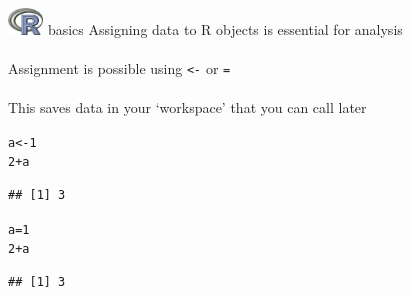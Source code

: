 \documentclass[xcolor=svgnames]{beamer}\usepackage[]{graphicx}\usepackage[]{color}
\makeatletter
\newcommand{\hlnum}[1]{\textcolor[rgb]{0.686,0.059,0.569}{#1}}%
\newcommand{\hlopt}[1]{\textcolor[rgb]{0,0,0}{#1}}%
\newcommand{\hlstd}[1]{\textcolor[rgb]{0.345,0.345,0.345}{#1}}%
\newcommand{\hlkwb}[1]{\textcolor[rgb]{0.69,0.353,0.396}{#1}}%
\newenvironment{kframe}{%
 \def\at@end@of@kframe{}%
 \ifinner\ifhmode%
  \def\at@end@of@kframe{\end{minipage}}%
  \begin{minipage}{\columnwidth}%
 \fi\fi%
 \def\FrameCommand##1{\hskip\@totalleftmargin \hskip-\fboxsep
 \colorbox{shadecolor}{##1}\hskip-\fboxsep
     \hskip-\linewidth \hskip-\@totalleftmargin \hskip\columnwidth}%
 \MakeFramed {\advance\hsize-\width
   \@totalleftmargin\z@ \linewidth\hsize
   \@setminipage}}%
 {\par\unskip\endMakeFramed%
 \at@end@of@kframe}
\newenvironment{knitrout}{}{} %
\makeatother
\begin{document}
\begin{frame}[t,fragile]{\includegraphics[width=0.07\textwidth]{Rlogo.jpg} \hspace{0.01in} basics}
Assigning data to R objects is essential for analysis\\~\\
Assignment is possible using \textit{\texttt{<-}} or \textit{\texttt{=}}\\~\\
This saves data in your `workspace' that you can call later
\begin{knitrout}\scriptsize
{}\color{fgcolor}\begin{kframe}
\begin{alltt}
\hlstd{a} \hlkwb{<-} \hlnum{1}
\hlnum{2} \hlopt{+} \hlstd{a}
\end{alltt}
\begin{verbatim}
## [1] 3
\end{verbatim}
\begin{alltt}
\hlstd{a} \hlkwb{=} \hlnum{1}
\hlnum{2} \hlopt{+} \hlstd{a}
\end{alltt}
\begin{verbatim}
## [1] 3
\end{verbatim}
\end{kframe}
\end{knitrout}
\end{frame}
\end{document}
